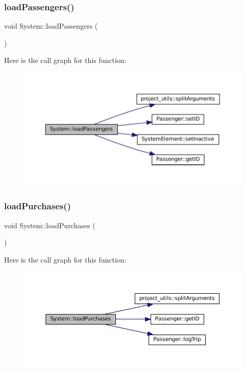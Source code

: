 \subsubsection{\texorpdfstring{load\+Passengers()}{loadPassengers()}}
{\footnotesize\ttfamily void System\+::load\+Passengers (\begin{DoxyParamCaption}{ }\end{DoxyParamCaption})}

Here is the call graph for this function\+:
\nopagebreak
\begin{figure}[H]
\begin{center}
\leavevmode
\includegraphics[width=350pt]{classSystem_a2e2da799ffbf2231bbc67eb4bc4ad4d8_cgraph}
\end{center}
\end{figure}
\mbox{\label{classSystem_a6dc7732405b691c4de1db0cc3626be49}} 
\subsubsection{\texorpdfstring{load\+Purchases()}{loadPurchases()}}
{\footnotesize\ttfamily void System\+::load\+Purchases (\begin{DoxyParamCaption}{ }\end{DoxyParamCaption})}

Here is the call graph for this function\+:
\nopagebreak
\begin{figure}[H]
\begin{center}
\leavevmode
\includegraphics[width=350pt]{classSystem_a6dc7732405b691c4de1db0cc3626be49_cgraph}
\end{center}
\end{figure}
\mbox{\label{classSystem_a53596ab10851974766ad4488375fdbb1}} 
